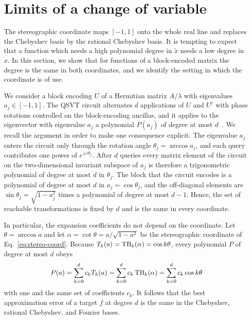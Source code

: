 \section{Limits of a change of variable}
\label{sec:limits}

The stereographic coordinate maps $[-1,1]$ onto the whole real line
and replaces the Chebyshev basis by the rational Chebyshev basis.
It is tempting to expect that a function which needs a high
polynomial degree in $\tilde x$ needs a low degree in $x$.  In
this section, we show that for functions of a block-encoded matrix
the degree is the same in both coordinates, and we identify the
setting in which the coordinate is of use.

We consider a block encoding $U$ of a Hermitian matrix $A/\lambda$
with eigenvalues $a_j\in[-1,1]$.  The QSVT circuit alternates $d$
applications of $U$ and $U^\dagger$ with phase rotations controlled
on the block-encoding ancillas, and it applies to the eigenvector
with eigenvalue $a_j$ a polynomial $P(a_j)$ of degree at most
$d$~\cite{GSLW2019,MartynRossiTanChuang2021}.  We recall the
argument in order to make one consequence explicit.  The
eigenvalue $a_j$ enters the circuit only through the rotation
angle $\theta_j=\arccos a_j$, and each query contributes one power
of $e^{\pm i\theta_j}$.  After $d$ queries every matrix element of
the circuit on the two-dimensional invariant subspace of $a_j$ is
therefore a trigonometric polynomial of degree at most $d$ in
$\theta_j$.  The block that the circuit encodes is a polynomial of
degree at most $d$ in $a_j=\cos\theta_j$, and the off-diagonal
elements are $\sin\theta_j=\sqrt{1-a_j^2}$ times a polynomial of
degree at most $d-1$.  Hence, the set of reachable transformations
is fixed by $d$ and is the same in every coordinate.

In particular, the expansion coefficients do not depend on the
coordinate.  Let $\theta=\arccos a$ and let
$\alpha=\cot\theta=a/\sqrt{1-a^2}$ be the stereographic coordinate
of Eq.~\eqref{eq:stereo-coord}.  Because
$T_k(a)=\mathrm{TB}_k(\alpha)=\cos k\theta$, every polynomial $P$ of degree
at most $d$ obeys
\begin{equation}
	P(a)=\sum_{k=0}^d c_k T_k(a)
	=\sum_{k=0}^d c_k\,\mathrm{TB}_k(\alpha)
	=\sum_{k=0}^d c_k\cos k\theta
	\label{eq:basis-indep}
\end{equation}
with one and the same set of coefficients $c_k$.  It follows that
the best approximation error of a target $f$ at degree $d$ is the
same in the Chebyshev, rational Chebyshev, and Fourier bases.

